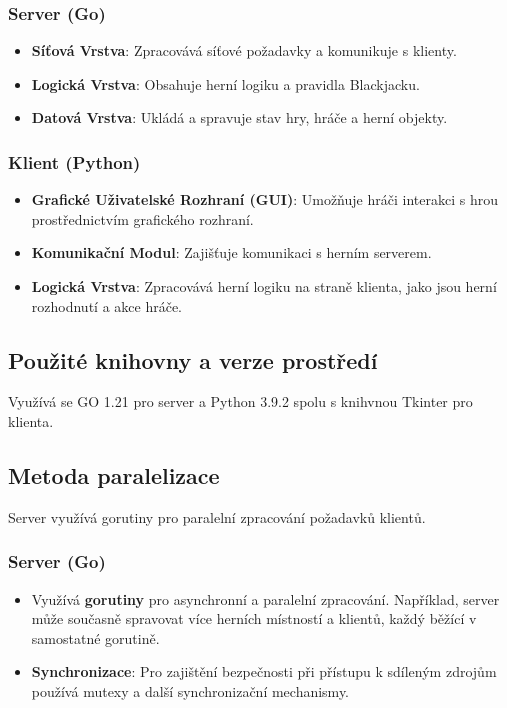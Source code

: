 \documentclass{article}
\begin{document}
\subsubsection{Server (Go)}
\begin{itemize}
  \item \textbf{Síťová Vrstva}: Zpracovává síťové požadavky a komunikuje s klienty.
  \item \textbf{Logická Vrstva}: Obsahuje herní logiku a pravidla Blackjacku.
  \item \textbf{Datová Vrstva}: Ukládá a spravuje stav hry, hráče a herní objekty.
\end{itemize}

\subsubsection{Klient (Python)}
\begin{itemize}
  \item \textbf{Grafické Uživatelské Rozhraní (GUI)}: Umožňuje hráči interakci s hrou prostřednictvím grafického rozhraní.
  \item \textbf{Komunikační Modul}: Zajišťuje komunikaci s herním serverem.
  \item \textbf{Logická Vrstva}: Zpracovává herní logiku na straně klienta, jako jsou herní rozhodnutí a akce hráče.
\end{itemize}

\subsection{Použité knihovny a verze prostředí}
Využívá se GO 1.21 pro server a Python 3.9.2 spolu s knihvnou Tkinter pro klienta.

\subsection{Metoda paralelizace}
Server využívá gorutiny pro paralelní zpracování požadavků klientů.

\subsubsection{Server (Go)}
\begin{itemize}
  \item Využívá \textbf{gorutiny} pro asynchronní a paralelní zpracování. Například, server může současně spravovat více herních místností a klientů, každý běžící v samostatné gorutině.
  \item \textbf{Synchronizace}: Pro zajištění bezpečnosti při přístupu k sdíleným zdrojům používá mutexy a další synchronizační mechanismy.
\end{itemize}
\end{document}
